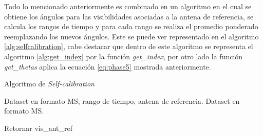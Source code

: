 Todo lo mencionado anteriormente es combinado en un algoritmo en el cual se obtiene los ángulos para las visibilidades asociadas a la antena de referencia, se calcula los rangos de tiempo y para cada rango se realiza el promedio ponderado reemplazando los nuevos ángulos. Este se puede ver representado en el algoritmo \ref{alg:selfcalibration}, cabe destacar que dentro de este algoritmo se representa el algoritmo \ref{alg:get_index} por la función \textit{get\_index}, por otro lado la función \textit{get\_thetas} aplica la ecuación \ref{eq:phase5} mostrada anteriormente. 

\begin{algorithm}[!ht]
	\caption{Algoritmo de \textit{Self-calibration}}
	\label{alg:selfcalibration}
	\begin{algorithmic}[1]
	\REQUIRE Dataset en formato MS, rango de tiempo, antena de referencia.
	\ENSURE Dataset en formato MS.
	
	  
	\ENDFOR
	
	\RETURN Retornar vis\_ant\_ref
	
	\end{algorithmic}
\end{algorithm}

